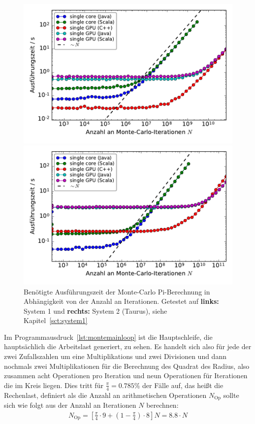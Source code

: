 \begin{figure}[H]
	\centering
	\begin{minipage}{0.5\linewidth}
		\includegraphics[width=\linewidth]{benchmarks-workload-scaling}
	\end{minipage}\begin{minipage}{0.5\linewidth}
		\includegraphics[width=\linewidth]{benchmarks-workload-scaling-taurus2}
	\end{minipage}
	\caption{Benötigte Ausführungszeit der Monte-Carlo Pi-Berechnung in Abhängigkeit von der Anzahl an Iterationen. Getestet auf \textbf{links:} System 1 und \textbf{rechts:} System 2 (Taurus), siehe Kapitel~\ref{sct:system1}}
	\label{fig:montepiworkloadscaling}
\end{figure}
Im Programmausdruck~\ref{lst:montemainloop} ist die Hauptschleife, die hauptsächlich die Arbeitslast generiert, zu sehen. Es handelt sich also für jede der zwei Zufallszahlen um eine Multiplikations und zwei Divisionen und dann nochmals zwei Multiplikationen für die Berechnung des Quadrat des Radius, also zusammen acht Operationen pro Iteration und neun Operationen für Iterationen die im Kreis liegen. Dies tritt für $\frac{\pi}{4}=0.785\%$ der Fälle auf, das heißt die Rechenlast, definiert als die Anzahl an arithmetischen Operationen $N_\text{Op}$ sollte sich wie folgt aus der Anzahl an Iterationen $N$ berechnen:
\begin{align}
	N_\text{Op}
	= \left[ \frac{\pi}{4}\cdot 9 + \left( 1-\frac{\pi}{4} \right)\cdot 8 \right] N
	= 8.8\cdot N
\end{align}

